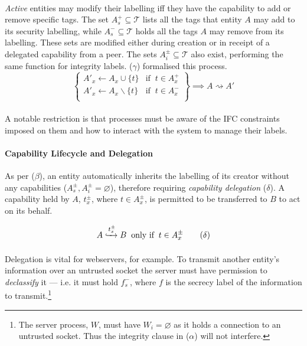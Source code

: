 \paragraph{} \textit{Active} entities may modify their labelling iff they have the capability to add or remove specific tags. The set $A_{s}^{+} \subseteq \mathcal{T}$ lists all the tags that entity $A$ may add to its security labelling, while $A_{s}^{-} \subseteq \mathcal{T}$ holds all the tags $A$ may remove from its labelling. These sets are modified either during creation or in receipt of a delegated capability from a peer. The sets $A_{i}^{\pm} \subseteq \mathcal{T}$ also exist, performing the same function for integrity labels. ($\gamma$) formalised this process.
\begin{equation}
    \left\{\begin{array}{lr}
        A'_x \leftarrow A_x \cup \{t\} & \text{if} \;\; t \in A_{x}^{+} \\
        A'_x \leftarrow A_x \smallsetminus \{t\} & \text{if} \;\; t \in A_{x}^{-} \\
    \end{array}\right\} \implies A \rightsquigarrow A' \tag{$\gamma$}
\end{equation}

\paragraph{} A notable restriction is that processes must be aware of the IFC constraints imposed on them and how to interact with the system to manage their labels.

\paragraph{Capability Lifecycle and Delegation} As per ($\beta$), an entity automatically inherits the labelling of its creator without any capabilities ($A_{s}^{\pm}, A_{i}^{\pm} = \varnothing$), therefore requiring \textit{capability delegation} ($\delta$). A capability held by $A$, $t_{x}^{\pm}$, where $t \in A_{x}^{\pm}$, is permitted to be transferred to $B$ to act on its behalf.

\vspace{-3mm}
\begin{equation}
    A \xhookrightarrow[]{t^{\pm}_{x}} B \;\; \text{only if} \;\; t \in A_{x}^{\pm} \tag{$\delta$}
\end{equation}

\paragraph{} Delegation is vital for webservers, for example. To transmit another entity's information over an untrusted socket the server must have permission to \textit{declassify} it --- i.e. it must hold $f_{s}^{-}$, where $f$ is the secrecy label of the information to transmit.\footnote{The server process, $W$, must have $W_{i} = \varnothing$ as it holds a connection to an untrusted socket. Thus the integrity clause in ($\alpha$) will not interfere.}


